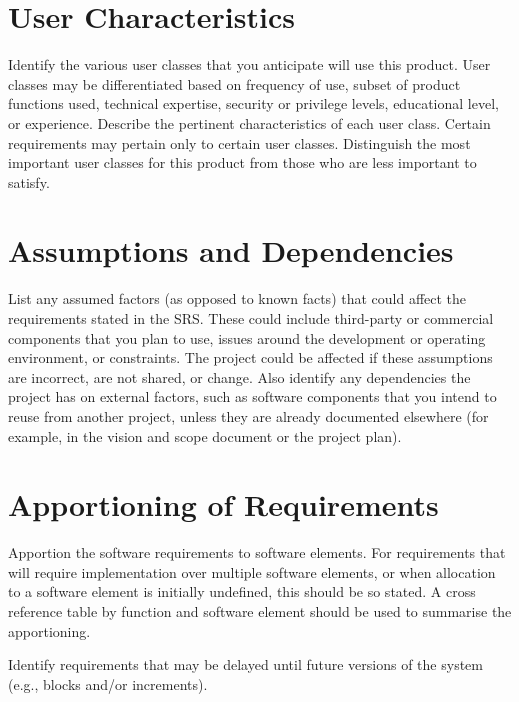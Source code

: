 \section{User Characteristics}

Identify the various user classes that you anticipate will use this product.
User classes may be differentiated based on frequency of use, subset of product
functions used, technical expertise, security or privilege levels, educational
level, or experience. Describe the pertinent characteristics of each user class.
Certain requirements may pertain only to certain user classes. Distinguish the
most important user classes for this product from those who are less important
to satisfy.

\section{Assumptions and Dependencies}

List any assumed factors (as opposed to known facts) that could affect the
requirements stated in the SRS. These could include third-party or commercial
components that you plan to use, issues around the development or operating
environment, or constraints. The project could be affected if these assumptions
are incorrect, are not shared, or change. Also identify any dependencies the
project has on external factors, such as software components that you intend to
reuse from another project, unless they are already documented elsewhere (for
example, in the vision and scope document or the project plan).

\section{Apportioning of Requirements}

Apportion the software requirements to software elements. For requirements that
will require implementation over multiple software elements, or when allocation
to a software element is initially undefined, this should be so stated. A cross
reference table by function and software element should be used to summarise the
apportioning.

Identify requirements that may be delayed until future versions of the system
(e.g., blocks and/or increments).
